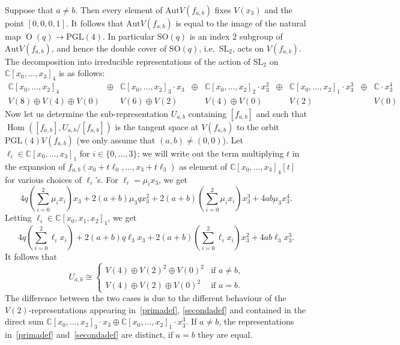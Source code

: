 \documentclass[11pt]{amsart}
\numberwithin{equation}{section}
\theoremstyle{plain}
\theoremstyle{remark}
\theoremstyle{definition}
\def\Hom{\operatorname{Hom}}
\newcommand{\Aut}{\mathrm{Aut}}
\newcommand{\PGL}{\mathrm{PGL}}
\newcommand{\SL}{\mathrm{SL}}
\newcommand{\SO}{\mathrm{SO}}
\DeclareMathOperator{\Ort}{O}
\newcommand{\CC}{{\mathbb C}}
\begin{document}
Suppose that $a\not=b$. Then every element of $\Aut V(f_{a,b})$ fixes $V(x_3)$ and the point $[0,0,0,1]$. It follows that $\Aut V(f_{a,b})$  is equal to the image of the natural map $\Ort(q)\to\PGL(4)$. In particular $\SO(q)$ is an index $2$ subgroup of 
$\Aut  V(f_{a,b})$, and hence the double cover of $\SO(q)$, i.e.~$\SL_2$, acts on $ V(f_{a,b})$. The decomposition into irreducible representations of the action of $\SL_2$   on $\CC[x_0,\ldots,x_3]_4$ is as follows: 
%
\begin{equation}\label{longrepr}
%
\begin{matrix}
%
 \scriptstyle \CC[x_0,\ldots,x_2]_4 & \scriptstyle  \oplus & \scriptstyle \CC[x_0,\ldots,x_2]_3\cdot x_3 
 & \scriptstyle \oplus & \scriptstyle \CC[x_0,\ldots,x_2]_2\cdot  x^2_3 & \scriptstyle 
\oplus & \scriptstyle \CC[x_0,\ldots,x_2]_1\cdot  x^3_3 & \scriptstyle \oplus & \scriptstyle \CC\cdot  x_3^4 \\
%
\scriptstyle   V(8)\oplus V(4)\oplus V(0) &    & \scriptstyle V(6)\oplus V(2)  
 &  & \scriptstyle V(4)\oplus V(0) &  &  \scriptstyle V(2) &  &  \scriptstyle V(0)
\end{matrix}
%
\end{equation}
%
Now let us determine the sub-representation $U_{a,b}$ containing $[f_{a,b}]$ and such that $\Hom([f_{a,b}],U_{a,b}/[f_{a,b}])$ is the  tangent space at $V(f_{a,b})$ to the orbit $\PGL(4) V(f_{a,b})$ (we only assume that  $(a,b)\not=(0,0)$). Let $\ell_i\in\CC[x_0,\ldots,x_3]_1$ for $i\in\{0,\ldots,3\}$; we will write out the term multiplying $t$ in the expansion of   $f_{a,b} (x_0+t\ell_0,\ldots,x_3+t\ell_3)$ as element of $\CC[x_0,\ldots,x_3]_4[t]$ for various choices of $\ell_i$'s. For $\ell_i=\mu_i x_3$, we get
%
\begin{equation}\label{primadef}
%
4q\left(\sum_{i=0}^2\mu_i x_i \right)x_3+2(a+b)\mu_3 q x_3^2+2(a+b)\left(\sum_{i=0}^2\mu_i x_i\right)x^3_3+ 4 ab\mu_3  x_3^4.
%
\end{equation}
%
Letting $\ell_i\in\CC[x_0,x_1,x_2]_1$, we get
%
\begin{equation}\label{secondadef}
%
4q\left(\sum_{i=0}^2\ell_i x_i \right)+2(a+b) q \ell_3 x_3+2(a+b)\left(\sum_{i=0}^2\ell_i x_i\right)x_3^2+  4ab \ell_3 x_3^3.
%
\end{equation}
%
It follows that
%
\begin{equation}\label{decofu}
%
 U_{a,b} \cong
 \begin{cases}
%
 V(4)\oplus V(2)^2\oplus V(0)^2 & \text{if $a\not=b$,} \\
 V(4)\oplus V(2)\oplus V(0)^2 & \text{if $a=b$.} 
%
\end{cases}
%
\end{equation}
%
The difference between the two cases is due to the different behaviour of the $V(2)$-representations appearing  in~\eqref{primadef}, \eqref{secondadef} and contained in the direct sum $ \CC[x_0,\ldots,x_2]_3\cdot x_3 \oplus  \CC[x_0,\ldots,x_2]_1\cdot x^3_3 $. If  $a\not=b$, the representations in~\eqref{primadef} and~\eqref{secondadef}   are distinct, if $a=b$ they are equal. 
%
\end{document}
